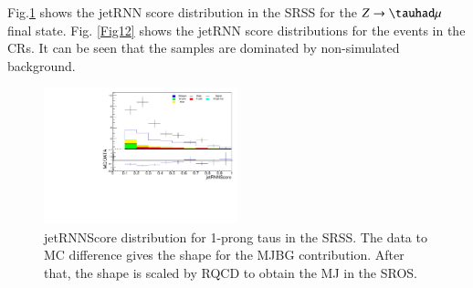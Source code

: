 Fig.\ref{Fig21} shows the jetRNN score distribution in the SRSS for the $Z\to\tauhad\mu$ final state. Fig. \ref{Fig12} shows the jetRNN score distributions for the events in the CRs. It can be seen that the samples are dominated by non-simulated background.

\begin{figure}[htbp]
	\centering
	\includegraphics[width=0.5\textwidth]{figures/Fig21}
	\caption{jetRNNScore distribution for 1-prong taus in the SRSS. The data to MC difference gives the shape for the MJBG contribution. After that, the shape is scaled by RQCD to obtain the MJ in the SROS.}
	\label{Fig21}
\end{figure}

